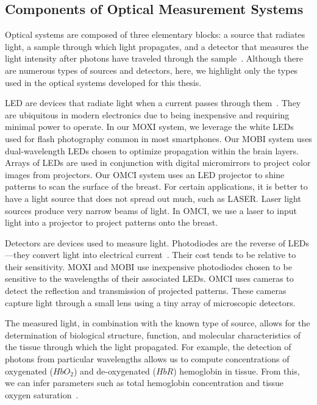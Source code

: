 \subsection{Components of Optical Measurement Systems}
Optical systems are composed of three elementary blocks: a source that radiates light, a sample through which light propagates, and a detector that measures the light intensity after photons have traveled through the sample~\cite{Webster2010}. Although there are numerous types of sources and detectors, here, we highlight only the types used in the optical systems developed for this thesis. 

\ac{LED} are devices that radiate light when a current passes through them~\cite{Webster2010}. They are ubiquitous in modern electronics due to being inexpensive and requiring minimal power to operate. In our \ac{MOXI} system, we leverage the white LEDs used for flash photography common in most smartphones. Our \ac{MOBI} system uses dual-wavelength \ac{LED}s chosen to optimize propagation within the brain layers. Arrays of \ac{LED}s are used in conjunction with digital micromirrors to project color images from projectors. Our \ac{OMCI} system uses an \ac{LED} projector to shine patterns to scan the surface of the breast. For certain applications, it is better to have a light source that does not spread out much, such as \ac{LASER}. Laser light sources produce very narrow beams of light. In \ac{OMCI}, we use a laser to input light into a projector to project patterns onto the breast. 

Detectors are devices used to measure light. Photodiodes are the reverse of \ac{LED}s---they convert light into electrical current~\cite{Webster2010}. Their cost tends to be relative to their sensitivity. \ac{MOXI} and \ac{MOBI} use inexpensive photodiodes chosen to be sensitive to the wavelengths of their associated \ac{LED}s. \ac{OMCI} uses cameras to detect the reflection and transmission of projected patterns. These cameras capture light through a small lens using a tiny array of microscopic detectors. 

The measured light, in combination with the known type of source, allows for the determination of biological structure, function, and molecular characteristics of the tissue through which the light propagated. For example, the detection of photons from particular wavelengths allows us to compute concentrations of oxygenated ($HbO_2$) and de-oxygenated ($HbR$) hemoglobin in tissue. From this, we can infer parameters such as total hemoglobin concentration and tissue oxygen saturation~\cite{Nunez2018}. 

